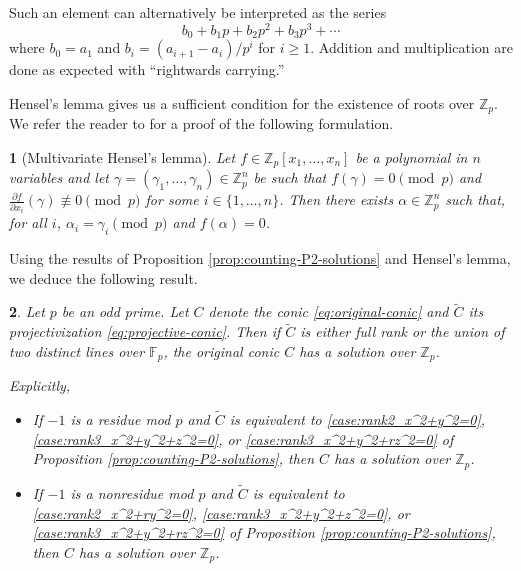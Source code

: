 \documentclass[10pt,a4paper]{amsart}
\numberwithin{equation}{section}
\numberwithin{figure}{section}
\theoremstyle{definition}
\theoremstyle{plain}
\newtheorem{thm}{\protect\theoremname}[section]
\theoremstyle{remark}
\theoremstyle{plain}
\theoremstyle{definition}
\newtheorem{defn}[thm]{\protect\definitionname}
\theoremstyle{plain}
\theoremstyle{plain}
\providecommand{\definitionname}{Definition}
\providecommand{\theoremname}{Theorem}
\newcommand{\F}{\mathbb{F}}
\newcommand{\Z}{\mathbb{Z}}
\newcommand{\Q}{\mathbb{Q}}
\begin{document}
	Such an element can alternatively be interpreted as the series
	\[
	b_0 + b_1 p + b_2 p^2 + b_3 p^3 + \cdots
	\]
	where $b_0 = a_1$ and $b_i = (a_{i+1} - a_i)/p^i$ for $i \geq 1$. Addition and multiplication are done as expected with ``rightwards carrying.''
	
		
	Hensel's lemma gives us a sufficient condition for the existence of roots over $\Z_p$. We refer the reader to \cite{henselMO} for a proof of the following formulation.
	\begin{thm}[Multivariate Hensel's lemma]\label{thm:hensels-one-eq}
		Let $f \in \Z_p[x_1,\ldots,x_n]$ be a polynomial in $n$ variables and let $\gamma = (\gamma_1,\ldots,\gamma_n)\in \Z_p^n$ be such that $f(\gamma) = 0 \pmod p$ and $\frac{\partial f}{\partial x_i}(\gamma) \not\equiv 0 \pmod p$ for some $i\in \{1,\ldots,n\}$. Then there exists $\alpha \in \Z_p^n$ such that, for all $i$, $\alpha_i = \gamma_i \pmod p$ and $f(\alpha) = 0$.
	\end{thm}
	Using the results of Proposition \ref{prop:counting-P2-solutions} and Hensel's lemma, we deduce the following result.
	\begin{thm}\label{thm:existence-over-Zp}
		Let $p$ be an odd prime. Let $C$ denote the conic \eqref{eq:original-conic} and $\widetilde{C}$ its projectivization \eqref{eq:projective-conic}. Then if $\widetilde{C}$ is either full rank or the union of two distinct lines over $\F_p$, the original conic $C$ has a solution over $\Z_p$.
		
		Explicitly,
		\begin{itemize}
			\item If $-1$ is a residue mod $p$ and $\widetilde{C}$ is equivalent to \eqref{case:rank2_x^2+y^2=0}, \eqref{case:rank3_x^2+y^2+z^2=0}, or \eqref{case:rank3_x^2+y^2+rz^2=0} of Proposition \ref{prop:counting-P2-solutions}, then $C$ has a solution over $\Z_p$.
			\item If $-1$ is a nonresidue mod $p$ and $\widetilde{C}$ is equivalent to \eqref{case:rank2_x^2+ry^2=0}, \eqref{case:rank3_x^2+y^2+z^2=0}, or \eqref{case:rank3_x^2+y^2+rz^2=0} of Proposition \ref{prop:counting-P2-solutions}, then $C$ has a solution over $\Z_p$.
		\end{itemize}
	\end{thm}
\end{document}
